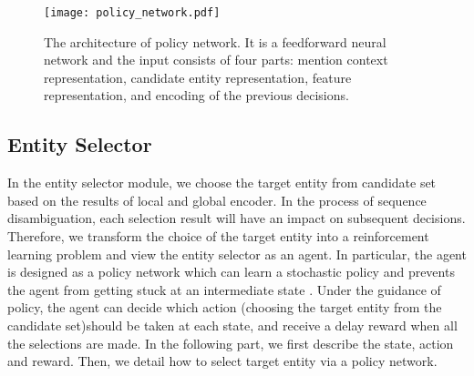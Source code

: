 \documentclass[sigconf]{acmart}
\begin{document}
\begin{figure}[t]
\centering
\texttt{[image: policy\_network.pdf]}
\caption{The architecture of policy network. It is a feedforward neural network and the input consists of four parts: mention context representation, candidate entity representation, feature representation, and encoding of the previous decisions.}
\end{figure}

\subsection{Entity Selector}
In the entity selector module, we choose the target entity from candidate set based on the results of local and global encoder. In the process of sequence disambiguation, each selection result will have an impact on subsequent decisions. Therefore, we transform the choice of the target entity into a reinforcement learning problem and view the entity selector as an agent. In particular, the agent is designed as a policy network which can learn a stochastic policy and prevents the agent from getting stuck at an intermediate state \cite{XiongHW17}. Under the guidance of policy, the agent can decide which action (choosing the target entity from the candidate set)should be taken at each state, and receive a delay reward when all the selections are made. In the following part, we first describe the state, action and reward. Then, we detail how to select target entity via a policy network.
\end{document}
